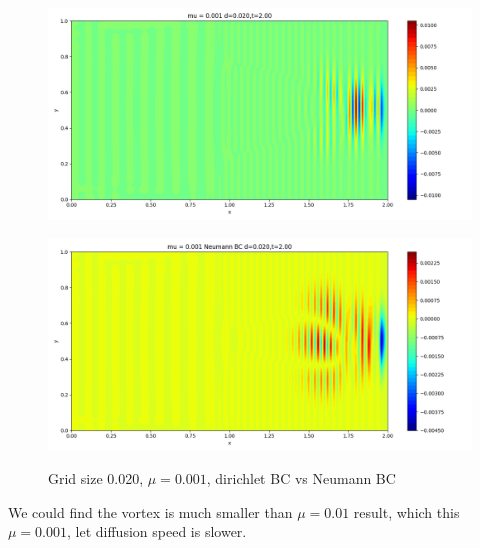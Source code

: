 \documentclass[12pt]{article}
\begin{document}
\begin{figure}[H]
\begin{minipage}{\linewidth}
    \begin{minipage}{0.5\textwidth}
    \includegraphics[width=\linewidth]{figuresmu/mu3d0.020t2.00.png}
    \label{fig9}
    \end{minipage}\hfill
    \begin{minipage}{0.5\textwidth}
    \includegraphics[width=\linewidth]{figuresmu/mu3Nud0.020t2.00.png}
    \label{fig10}
    \end{minipage}
    \caption{Grid size 0.020, $\mu = 0.001$, dirichlet BC vs Neumann BC}
    \end{minipage}
    \end{figure}


We could find the vortex is much smaller than $\mu = 0.01$ 
result, which this $\mu = 0.001$, let diffusion speed is slower.
\end{document}
